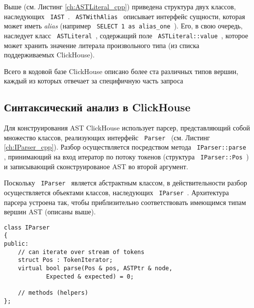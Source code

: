 Выше (см. Листинг \ref{ch:ASTLiteral_cpp}) приведена структура двух классов, наследующих \texttt{ IAST }. \texttt{ ASTWithAlias } описывает интерфейс сущности, которая может иметь \textit{alias} (например \texttt{ SELECT 1 as alias_one }). Его, в свою очередь, наследует класс \texttt{ ASTLiteral }, содержащий поле \texttt{ ASTLiteral::value }, которое может хранить значение литерала произвольного типа (из списка поддерживаемых ClickHouse).

Всего в кодовой базе ClickHouse описано более ста различных типов вершин, каждый из которых отвечает за специфичную часть запроса

\subsection{Синтаксический анализ в ClickHouse}
Для конструирования AST ClickHouse использует парсер, представляющий собой множество классов, реализующих интерфейс \texttt{ Parser } (см. Листинг \ref{ch:IParser_cpp}). Разбор осуществляется посредством метода \texttt{ IParser::parse }, принимающий на вход итератор по потоку токенов (структура \texttt{ IParser::Pos }) и записывающий сконструированое AST во второй аргумент.

Поскольку \texttt{ IParser } является абстрактным классом, в действительности разбор осуществляется объектами классов, наследующих \texttt{ IParser }. Архитектура парсера устроена так, чтобы приблизительно соответствовать имеющимся типам вершин AST (описаны выше).
\begin{code}
    \label{ch:IParser_cpp}
    \begin{verbatim}
class IParser
{
public:
    // can iterate over stream of tokens
    struct Pos : TokenIterator;
    virtual bool parse(Pos & pos, ASTPtr & node,
            Expected & expected) = 0;

    // methods (helpers)
};

    \end{verbatim}
\end{code}

